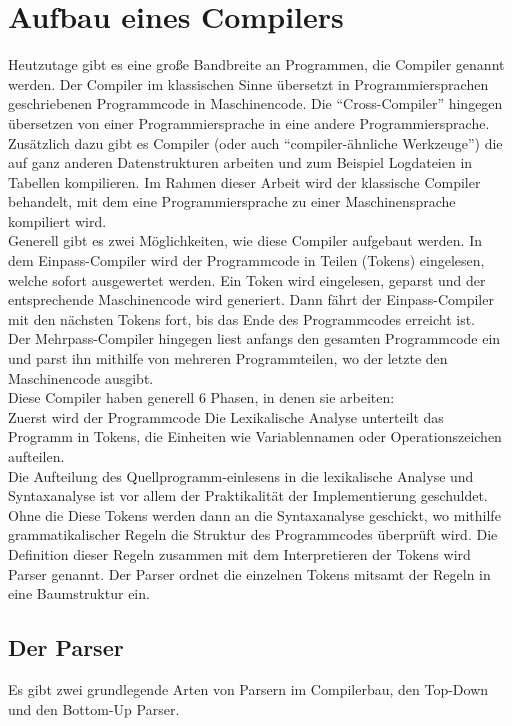 \section{Aufbau eines Compilers}

Heutzutage gibt es eine große Bandbreite an Programmen, die Compiler genannt werden.
Der Compiler im klassischen Sinne übersetzt in Programmiersprachen geschriebenen Programmcode in Maschinencode.
Die ``Cross-Compiler'' hingegen übersetzen von einer Programmiersprache in eine andere Programmiersprache.
Zusätzlich dazu gibt es Compiler (oder auch ``compiler-ähnliche Werkzeuge'') die auf ganz anderen Datenstrukturen arbeiten und zum Beispiel Logdateien in Tabellen kompilieren.
Im Rahmen dieser Arbeit wird der klassische Compiler behandelt, mit dem eine Programmiersprache zu einer Maschinensprache kompiliert wird.\\
Generell gibt es zwei Möglichkeiten, wie diese Compiler aufgebaut werden.
In dem Einpass-Compiler wird der Programmcode in Teilen (Tokens) eingelesen, welche sofort ausgewertet werden.
Ein Token wird eingelesen, geparst und der entsprechende Maschinencode wird generiert.
Dann fährt der Einpass-Compiler mit den nächsten Tokens fort, bis das Ende des Programmcodes erreicht ist.\\
Der Mehrpass-Compiler hingegen liest anfangs den gesamten Programmcode ein und parst ihn mithilfe von mehreren Programmteilen, wo der letzte den Maschinencode ausgibt\cite{mossenbock:2024}.\\
Diese Compiler haben generell 6 Phasen, in denen sie arbeiten:\\
Zuerst wird der Programmcode 
Die Lexikalische Analyse unterteilt das Programm in Tokens, die Einheiten wie Variablennamen oder Operationszeichen aufteilen.\\
Die Aufteilung des Quellprogramm-einlesens in die lexikalische Analyse und Syntaxanalyse ist vor allem der Praktikalität der Implementierung geschuldet.
Ohne die 
Diese Tokens werden dann an die Syntaxanalyse geschickt, wo mithilfe grammatikalischer Regeln die Struktur des Programmcodes überprüft wird.
Die Definition dieser Regeln zusammen mit dem Interpretieren der Tokens wird Parser genannt.
Der Parser ordnet die einzelnen Tokens mitsamt der Regeln in eine Baumstruktur ein.

\subsection{Der Parser}

Es gibt zwei grundlegende Arten von Parsern im Compilerbau, den Top-Down und den Bottom-Up Parser.\\

